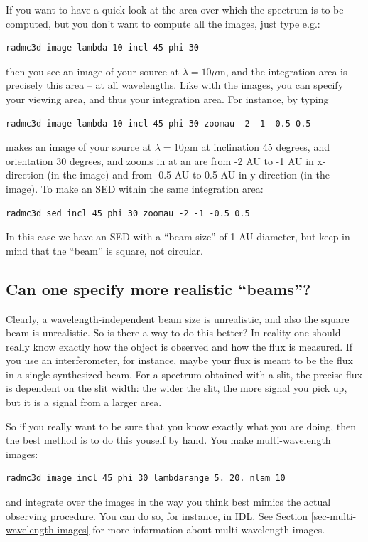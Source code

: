\documentclass{report}
\newenvironment{asciibox}%
  {\begin{list}{}{%
    \setlength{\topsep}{0.5em}%
    \setlength{\parskip}{0em}%
    \setlength{\parsep}{0em}%
    \setlength{\itemsep}{0em}%
    \setlength{\rightmargin}{0em}%
    \setlength{\leftmargin}{3.0em}%
    \setlength{\labelsep}{1em}%
    \setlength{\labelwidth}{2em}%
  }\normalfont\footnotesize\item}
  {\end{list}}
\begin{document}
If you want to have a quick look at the area over which the spectrum is
to be computed, but you don't want to compute all the images, just type
e.g.:
\begin{asciibox}\begin{verbatim}
radmc3d image lambda 10 incl 45 phi 30
\end{verbatim}\end{asciibox}
then you see an image of your source at $\lambda=10\mu$m, and the
integration area is precisely this area -- at all wavelengths. Like with
the images, you can specify your viewing area, and thus your integration
area. For instance, by typing
\begin{asciibox}\begin{verbatim}
radmc3d image lambda 10 incl 45 phi 30 zoomau -2 -1 -0.5 0.5
\end{verbatim}\end{asciibox}
makes an image of your source at $\lambda=10\mu$m at inclination 45 degrees,
and orientation 30 degrees, and zooms in at an are from -2 AU to -1 AU
in x-direction (in the image) and from -0.5 AU to 0.5 AU in y-direction 
(in the image). To make an SED within the same integration area:
\begin{asciibox}\begin{verbatim}
radmc3d sed incl 45 phi 30 zoomau -2 -1 -0.5 0.5
\end{verbatim}\end{asciibox}
In this case we have an SED with a ``beam size'' of 1 AU diameter, but
keep in mind that the ``beam'' is square, not circular. 


\subsection{Can one specify more realistic ``beams''?}
\label{sec-aperture}
%
Clearly, a wavelength-independent beam size is unrealistic, and also the
square beam is unrealistic. So is there a way to do this better? In
reality one should really know exactly how the object is observed and
how the flux is measured. If you use an interferometer, for instance,
maybe your flux is meant to be the flux in a single synthesized beam.
For a spectrum obtained with a slit, the precise flux is dependent on
the slit width: the wider the slit, the more signal you pick up, but
it is a signal from a larger area. 

So if you really want to be sure that you know exactly what you are doing,
then the best method is to do this youself by hand. You make
multi-wavelength images:
\begin{asciibox}\begin{verbatim}
radmc3d image incl 45 phi 30 lambdarange 5. 20. nlam 10
\end{verbatim}\end{asciibox}
and integrate over the images in the way you think best mimics the actual
observing procedure. You can do so, for instance, in IDL.  See Section
\ref{sec-multi-wavelength-images} for more information about
multi-wavelength images.
\end{document}
